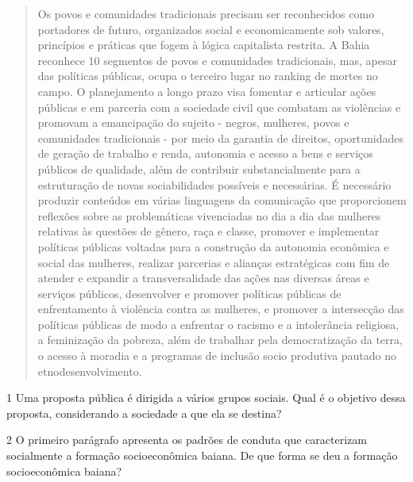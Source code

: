 \begin{quote}
Os povos e comunidades tradicionais precisam ser reconhecidos como
portadores de futuro, organizados social e economicamente sob valores,
princípios e práticas que fogem à lógica capitalista restrita. A Bahia
reconhece 10 segmentos de povos e comunidades tradicionais, mas, apesar
das políticas públicas, ocupa o terceiro lugar no ranking de mortes no
campo. O planejamento a longo prazo visa fomentar e articular ações
públicas e em parceria com a sociedade civil que combatam as violências
e promovam a emancipação do sujeito - negros, mulheres, povos e
comunidades tradicionais - por meio da garantia de direitos,
oportunidades de geração de trabalho e renda, autonomia e acesso a bens
e serviços públicos de qualidade, além de contribuir substancialmente
para a estruturação de novas sociabilidades possíveis e necessárias. É
necessário produzir conteúdos em várias linguagens da comunicação que
proporcionem reflexões sobre as problemáticas vivenciadas no dia a dia
das mulheres relativas às questões de gênero, raça e classe, promover e
implementar políticas públicas voltadas para a construção da autonomia
econômica e social das mulheres, realizar parcerias e alianças
estratégicas com fim de atender e expandir a transversalidade das ações
nas diversas áreas e serviços públicos, desenvolver e promover políticas
públicas de enfrentamento à violência contra as mulheres, e promover a
intersecção das políticas públicas de modo a enfrentar o racismo e a
intolerância religiosa, a feminização da pobreza, além de trabalhar pela
democratização da terra, o acesso à moradia e a programas de inclusão
socio produtiva pautado no etnodesenvolvimento.

\end{quote}

\num{1} Uma proposta pública é dirigida a vários grupos sociais. Qual é o
objetivo dessa proposta, considerando a sociedade a que ela se destina?


\num{2} O primeiro parágrafo apresenta os padrões de conduta que caracterizam
socialmente a formação socioeconômica baiana. De que forma se deu a
formação socioeconômica baiana?


